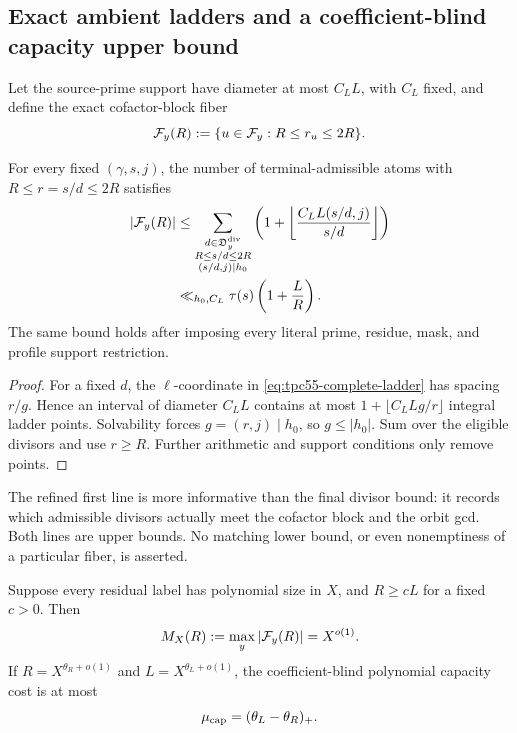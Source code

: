\subsection{Exact ambient ladders and a coefficient-blind capacity upper bound}

Let the source-prime support have diameter at most \(C_LL\), with \(C_L\)
fixed, and define the exact cofactor-block fiber
\begin{equation}
 \mathcal F_y(R):=\{u\in\mathcal F_y:R\le r_u\le2R\}.
 \label{eq:tpc55-cofactor-block}
\end{equation}

\begin{proposition}
\label{prop:tpc55-fiber-capacity}
For every fixed \((\gamma,s,j)\), the number of terminal-admissible atoms
with \(R\le r=s/d\le2R\) satisfies
\begin{align}
 |\mathcal F_y(R)|
 &\le
 \sum_{\substack{d\in\mathfrak D_y^{\rm div}\\
                  R\le s/d\le2R\\(s/d,j)\mid h_0}}
 \left(1+\left\lfloor
 \frac{C_LL(s/d,j)}{s/d}\right\rfloor\right)
 \label{eq:tpc55-exact-capacity-sum}\\
 &\ll_{h_0,C_L}
 \tau(s)\left(1+\frac LR\right).
 \label{eq:tpc55-fiber-capacity}
\end{align}
The same bound holds after imposing every literal prime, residue, mask, and
profile support restriction.
\end{proposition}

\begin{proof}
For a fixed \(d\), the \(\ell\)-coordinate in
\eqref{eq:tpc55-complete-ladder} has spacing \(r/g\).  Hence an interval of
diameter \(C_LL\) contains at most
\(1+\lfloor C_LL g/r\rfloor\) integral ladder points.  Solvability forces
\(g=(r,j)\mid h_0\), so \(g\le|h_0|\).  Sum over the eligible divisors and
use \(r\ge R\).  Further arithmetic and support conditions only remove
points.
\end{proof}

The refined first line is more informative than the final divisor bound:
it records which admissible divisors actually meet the cofactor block and
the orbit gcd.  Both lines are upper bounds.  No matching lower bound, or
even nonemptiness of a particular fiber, is asserted.

\begin{corollary}
\label{cor:tpc55-balanced-multiplicity}
Suppose every residual label has polynomial size in \(X\), and
\(R\ge cL\) for a fixed \(c>0\).  Then
\begin{equation}
 M_X(R):=\max_y|\mathcal F_y(R)|=X^{o(1)}.
 \label{eq:tpc55-balanced-subpower}
\end{equation}
If \(R=X^{\theta_R+o(1)}\) and \(L=X^{\theta_L+o(1)}\), the
coefficient-blind polynomial capacity cost is at most
\begin{equation}
 \mu_{\rm cap}=(\theta_L-\theta_R)_+.
 \label{eq:tpc55-capacity-exponent}
\end{equation}
\end{corollary}

